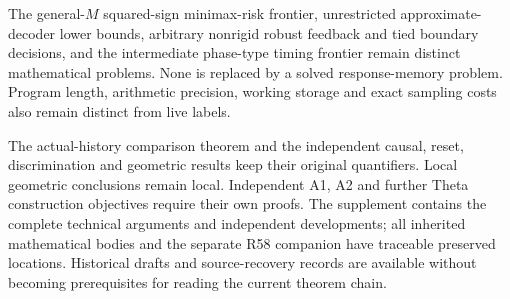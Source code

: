 The general-$M$ squared-sign minimax-risk frontier, unrestricted
approximate-decoder lower bounds, arbitrary nonrigid robust feedback and
tied boundary decisions, and the intermediate phase-type timing frontier
remain distinct mathematical problems. None is replaced by a solved
response-memory problem. Program length, arithmetic precision, working
storage and exact sampling costs also remain distinct from live labels.

The actual-history comparison theorem and the independent causal, reset,
discrimination and geometric results keep their original quantifiers.
Local geometric conclusions remain local. Independent A1, A2 and further
Theta construction objectives require their own proofs. The supplement
contains the complete technical arguments and independent developments;
all inherited mathematical bodies and the separate R58 companion have
traceable preserved locations. Historical drafts and source-recovery
records are available without becoming prerequisites for reading the
current theorem chain.

\renewcommand{\bibliofont}{\footnotesize\setlength{\baselineskip}{10.8pt}}


